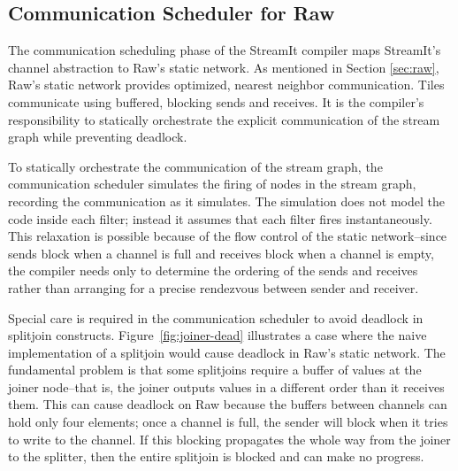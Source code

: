 
\subsection{Communication Scheduler for Raw}
\label{sec:rawcommunic}

The communication scheduling phase of the StreamIt compiler maps
StreamIt's channel abstraction to Raw's static network.  As mentioned
in Section \ref{sec:raw}, Raw's static network provides optimized,
nearest neighbor communication.  Tiles communicate using buffered,
blocking sends and receives.  It is the compiler's responsibility to
statically orchestrate the explicit communication of the stream graph
while preventing deadlock.

To statically orchestrate the communication of the stream graph, the
communication scheduler simulates the firing of nodes in the stream
graph, recording the communication as it simulates.  The simulation
does not model the code inside each filter; instead it assumes that
each filter fires instantaneously.  This relaxation is possible
because of the flow control of the static network--since sends block
when a channel is full and receives block when a channel is empty, the
compiler needs only to determine the ordering of the sends and
receives rather than arranging for a precise rendezvous between sender
and receiver.

% 

Special care is required in the communication scheduler to avoid
deadlock in splitjoin constructs.  Figure~\ref{fig:joiner-dead}
illustrates a case where the naive implementation of a splitjoin would
cause deadlock in Raw's static network.  The fundamental problem is
that some splitjoins require a buffer of values at the joiner
node--that is, the joiner outputs values in a different order than it
receives them.  This can cause deadlock on Raw because the buffers
between channels can hold only four elements; once a channel is full,
the sender will block when it tries to write to the channel.  If this
blocking propagates the whole way from the joiner to the splitter,
then the entire splitjoin is blocked and can make no progress.

